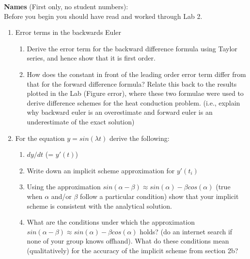 \documentclass[12pt]{article}
\begin{document}
{\bf Names} (First only, no student numbers):\\


Before you begin you should have read and worked through Lab 2.


\begin{enumerate}
\item Error terms in the backwards Euler
\begin{enumerate}
\item Derive the error term for the backward difference formula using Taylor series, and hence show that it is first order.
\vspace{3in}

\item How does the constant in front of the leading order error term differ from that for the forward difference formula? Relate this back to the results plotted in the Lab (Figure error), where these two formulae were used to derive difference schemes for the heat conduction problem. (i.e., explain why backward euler is an overestimate and forward euler is an underestimate of the exact solution)
\vspace{3in}
\end{enumerate}
\item For the equation $y = sin(\lambda t)$ derive the following:
\begin{enumerate}
\item $dy/dt$ (= $y'(t)$)
\vspace{1in}
\item Write down an implicit scheme approximation for $y'(t_i)$
\vspace{1.5in}
\item Using the approximation $sin(\alpha - \beta) \approx sin(\alpha) - \beta cos(\alpha)$ (true when $\alpha$ and/or $\beta$ follow a particular condition) show that your implicit scheme is consistent with the analytical solution.  
\vspace{2in}
\item What are the conditions under which the approximation $sin(\alpha - \beta) \approx sin(\alpha) - \beta cos(\alpha)$ holds? (do an internet search if none of your group knows offhand). What do these conditions mean (qualitatively) for the accuracy of the implicit scheme from section 2b? 
\end{enumerate}

\vspace{2in}

\end{enumerate}
\end{document}
